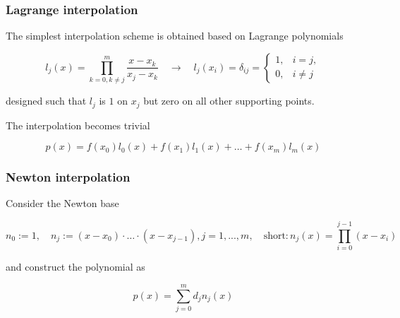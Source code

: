 \subsubsection{Lagrange interpolation}

The simplest interpolation scheme is obtained based on Lagrange
polynomials

\begin{equation}
    l_j(x) = \prod_{k = 0, k \neq j}^{m} \frac{x-x_k}{x_j - x_k} \quad \rightarrow \quad l_j(x_i) = \delta_{ij} = \begin{cases}
        1, &i = j, \\
        0, &i \neq j
    \end{cases}
\end{equation}

designed such that $l_j$ is $1$ on $x_j$ but zero on all other supporting points.

The interpolation becomes trivial

\begin{equation}
    p(x) = f(x_0) l_0(x) + f(x_1) l_1(x) + \dots + f(x_m) l_m(x)
\end{equation}


\subsubsection{Newton interpolation}

Consider the Newton base

\begin{equation}
    n_0 := 1, \quad n_j := (x-x_0) \cdot \dots \cdot (x - x_{j-1}), j = 1,...,m, \quad \text{short:} \, n_j(x) = \prod_{i = 0}^{j - 1} (x-x_i)
\end{equation}

and construct the polynomial as

\begin{equation}
    p(x) = \sum_{j=0}^{m} d_j n_j(x)
\end{equation}

